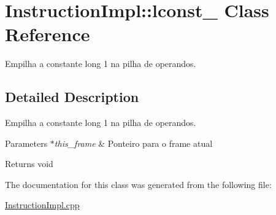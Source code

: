 \hypertarget{class_instruction_impl_1_1lconst__1}{}\section{Instruction\+Impl\+:\+:lconst\+\_ Class Reference}
\label{class_instruction_impl_1_1lconst__1}


Empilha a constante long 1 na pilha de operandos.  




\subsection{Detailed Description}
Empilha a constante long 1 na pilha de operandos. 


\begin{DoxyParams}{Parameters}
{\em $\ast$this\+\_\+frame} & Ponteiro para o frame atual \\
\hline
\end{DoxyParams}
\begin{DoxyReturn}{Returns}
void 
\end{DoxyReturn}


The documentation for this class was generated from the following file\+:\begin{DoxyCompactItemize}
\item 
\hyperlink{_instruction_impl_8cpp}{Instruction\+Impl.\+cpp}\end{DoxyCompactItemize}
